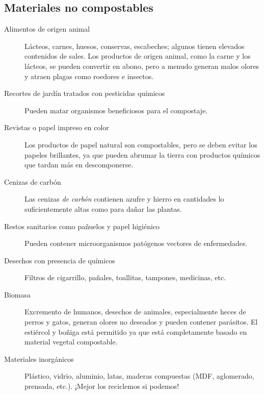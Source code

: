 \documentclass[../main.tex]{subfiles}
\begin{document}
\subsection{Materiales no compostables}

\begin{description}
    \item [Alimentos de origen animal] 
    Lácteos, carnes, huesos, conservas, escabeches; algunos tienen elevados contenidos de sales.  Los productos de origen animal, como la carne y los lácteos, se pueden convertir en abono, pero a menudo generan malos olores y atraen plagas como roedores e insectos.\\[-5pt]
    \item [Recortes de jardín tratados con pesticidas químicos] 
    Pueden matar organismos beneficiosos para el compostaje.\\[-5pt]
    \item [Revistas o papel impreso en color] 
    Los productos de papel natural son compostables, pero se deben evitar los papeles brillantes, ya que pueden abrumar la tierra con productos químicos que tardan más en descomponerse.\\[-5pt]
    \item [Cenizas de carbón] 
    Las cenizas \emph{de carbón} contienen azufre y hierro en cantidades lo suficientemente altas como para dañar las plantas.\\[-5pt]
    \item [Restos sanitarios como pañuelos y papel higiénico] 
    Pueden contener microorganismos patógenos vectores de enfermedades.\\[-5pt]
    \item [Desechos con presencia de químicos] 
    Filtros de cigarrillo, pañales, toallitas, tampones, medicinas, etc.\\[-5pt]
    \item [Biomasa] 
    Excremento de humanos, desechos de animales, especialmente heces de perros y gatos, generan olores no deseados y pueden contener parásitos. El estiércol y boñiga está permitido ya que está completamente basado en material vegetal compostable.\\[-5pt]
    \item [Materiales inorgánicos] 
    Plástico, vidrio, aluminio, latas, maderas compuestas (MDF, aglomerado, prensada, etc.). ¡Mejor los reciclemos si podemos!\\[-5pt]
\end{description}
\end{document}
